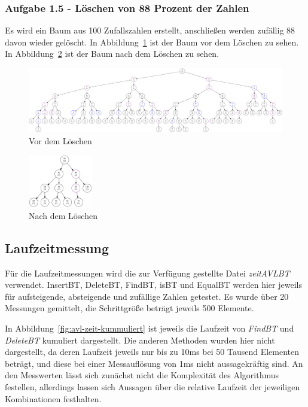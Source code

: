 \subsubsection{Aufgabe 1.5 - Löschen von 88 Prozent der Zahlen}
Es wird ein Baum aus 100 Zufallszahlen erstellt, anschließen werden zufällig 88 davon wieder
gelöscht.
In Abbildung~\ref{fig:88before} ist der Baum vor dem Löschen zu sehen.
In Abbildung~\ref{fig:88after} ist der Baum nach dem Löschen zu sehen.

\begin{figure}[hbtp]
    \centerline{\includegraphics[width = 1.2\textwidth]{img/gv/aufgabe1_6_before.pdf}}
    \caption{Vor dem Löschen}
    \label{fig:88before}
\end{figure}

\begin{figure}[hbtp]
    \centering
    \includegraphics[width = 0.25\textwidth]{img/gv/aufgabe1_6_after.pdf}
    \caption{Nach dem Löschen}
    \label{fig:88after}
\end{figure}

\subsection{Laufzeitmessung}\label{subsec:laufzeitmessung}

Für die Laufzeitmessungen wird die zur Verfügung gestellte Datei \textit{zeitAVLBT} verwendet.
InsertBT, DeleteBT, FindBT, isBT und EqualBT werden hier jeweils für aufsteigende, absteigende und
zufällige Zahlen getestet.
Es wurde über 20 Messungen gemittelt, die Schrittgröße beträgt jeweils 500 Elemente.

In Abbildung~\ref{fig:avl-zeit-kummuliert} ist jeweils die Laufzeit von \textit{FindBT} und
\textit{DeleteBT} kumuliert dargestellt.
Die anderen Methoden wurden hier nicht dargestellt, da deren Laufzeit jeweils nur bis zu 10ms bei
50 Tausend Elementen beträgt, und diese bei einer Messauflösung von 1ms nicht aussagekräftig
sind.
An den Messwerten lässt sich zunächst nicht die Komplexität des Algorithmus festellen,
allerdings lassen sich Aussagen über die relative Laufzeit der jeweiligen Kombinationen festhalten.

